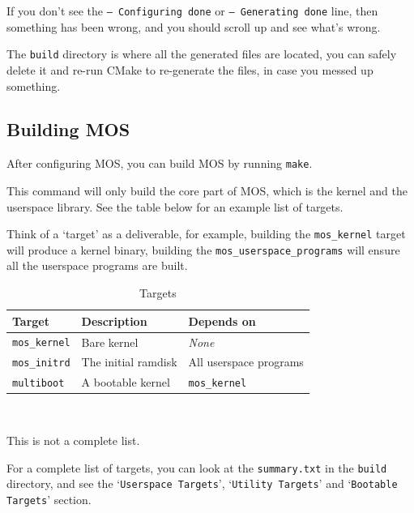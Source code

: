 If you don't see the \texttt{-- Configuring done} or \texttt{-- Generating done} line, then
something has been wrong, and you should scroll up and see what's wrong.

The \texttt{build} directory is where all the generated files are located, you can safely
delete it and re-run CMake to re-generate the files, in case you messed up something.

\subsection{Building MOS}

After configuring MOS, you can build MOS by running \texttt{make}.

This command will only build the core part of MOS, which is the kernel and the userspace library.
See the table below for an example list of targets.

\begin{tip}
    \item Think of a `target' as a deliverable, for example, building the \texttt{mos\_kernel} target
    will produce a kernel binary, building the \texttt{mos\_userspace\_programs} will ensure
    all the userspace programs are built.
\end{tip}

\begin{table}[ht]
    \centering
    \small
    \begin{tabular}{|l|l|l|}
        \hline
        \textbf{Target}      & \textbf{Description} & \textbf{Depends on}    \\ \hline
        \texttt{mos\_kernel} & Bare kernel          & \textit{None}          \\ \hline
        \texttt{mos\_initrd} & The initial ramdisk  & All userspace programs \\ \hline
        \texttt{multiboot}   & A bootable kernel    & \texttt{mos\_kernel}   \\ \hline
    \end{tabular} \\
    \begin{note}
        \item This is not a complete list.
        \item For a complete list of targets, you can look at the \texttt{summary.txt} in the \texttt{build} directory,
        and see the `\texttt{Userspace Targets}', `\texttt{Utility Targets}' and `\texttt{Bootable Targets}' section.
    \end{note}
    \caption{Targets}
    \label{tab:targets}
\end{table}

